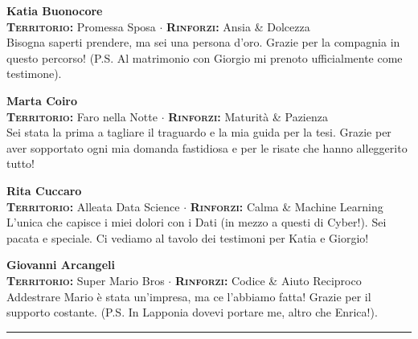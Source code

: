 \noindent\begin{minipage}{\linewidth}
\textbf{Katia Buonocore} \\
{\footnotesize \textbf{\textsc{Territorio:}} Promessa Sposa $\cdot$ \textbf{\textsc{Rinforzi:}} Ansia \& Dolcezza} \\
Bisogna saperti prendere, ma sei una persona d'oro. Grazie per la compagnia in questo percorso! (P.S. Al matrimonio con Giorgio mi prenoto ufficialmente come testimone).
\end{minipage}
\vspace{0.6cm}

\noindent\begin{minipage}{\linewidth}
\textbf{Marta Coiro} \\
{\footnotesize \textbf{\textsc{Territorio:}} Faro nella Notte $\cdot$ \textbf{\textsc{Rinforzi:}} Maturità \& Pazienza} \\
Sei stata la prima a tagliare il traguardo e la mia guida per la tesi. Grazie per aver sopportato ogni mia domanda fastidiosa e per le risate che hanno alleggerito tutto!
\end{minipage}
\vspace{0.6cm}

\noindent\begin{minipage}{\linewidth}
\textbf{Rita Cuccaro} \\
{\footnotesize \textbf{\textsc{Territorio:}} Alleata Data Science $\cdot$ \textbf{\textsc{Rinforzi:}} Calma \& Machine Learning} \\
L'unica che capisce i miei dolori con i Dati (in mezzo a questi di Cyber!). Sei pacata e speciale. Ci vediamo al tavolo dei testimoni per Katia e Giorgio!
\end{minipage}
\vspace{0.6cm}

\noindent\begin{minipage}{\linewidth}
\textbf{Giovanni Arcangeli} \\
{\footnotesize \textbf{\textsc{Territorio:}} Super Mario Bros $\cdot$ \textbf{\textsc{Rinforzi:}} Codice \& Aiuto Reciproco} \\
Addestrare Mario è stata un'impresa, ma ce l'abbiamo fatta! Grazie per il supporto costante. (P.S. In Lapponia dovevi portare me, altro che Enrica!).
\end{minipage}

\vspace{0.6cm}
\begin{center} \rule{0.5\linewidth}{0.5pt} \end{center}
\vspace{0.6cm}

